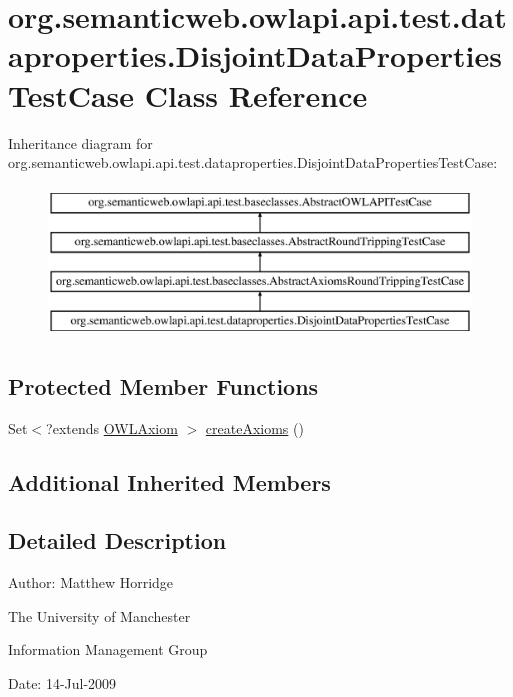 \hypertarget{classorg_1_1semanticweb_1_1owlapi_1_1api_1_1test_1_1dataproperties_1_1_disjoint_data_properties_test_case}{\section{org.\-semanticweb.\-owlapi.\-api.\-test.\-dataproperties.\-Disjoint\-Data\-Properties\-Test\-Case Class Reference}
\label{classorg_1_1semanticweb_1_1owlapi_1_1api_1_1test_1_1dataproperties_1_1_disjoint_data_properties_test_case}
}
Inheritance diagram for org.\-semanticweb.\-owlapi.\-api.\-test.\-dataproperties.\-Disjoint\-Data\-Properties\-Test\-Case\-:\begin{figure}[H]
\begin{center}
\leavevmode
\includegraphics[height=4.000000cm]{classorg_1_1semanticweb_1_1owlapi_1_1api_1_1test_1_1dataproperties_1_1_disjoint_data_properties_test_case}
\end{center}
\end{figure}
\subsection*{Protected Member Functions}
\begin{DoxyCompactItemize}
\item 
Set$<$?extends \hyperlink{interfaceorg_1_1semanticweb_1_1owlapi_1_1model_1_1_o_w_l_axiom}{O\-W\-L\-Axiom} $>$ \hyperlink{classorg_1_1semanticweb_1_1owlapi_1_1api_1_1test_1_1dataproperties_1_1_disjoint_data_properties_test_case_aea68ef6494bd6fbba1a19aaaffab6b14}{create\-Axioms} ()
\end{DoxyCompactItemize}
\subsection*{Additional Inherited Members}


\subsection{Detailed Description}
Author\-: Matthew Horridge\par
 The University of Manchester\par
 Information Management Group\par
 Date\-: 14-\/\-Jul-\/2009 

